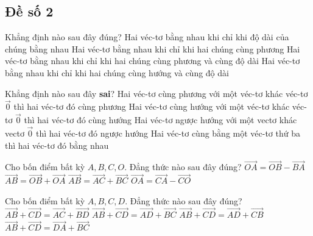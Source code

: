\subsection*{Đề số 2}
\begin{ex}%
	Khẳng định nào sau đây đúng?
	\choice
	{Hai véc-tơ bằng nhau khi chỉ khi độ dài của chúng bằng nhau}
	{Hai véc-tơ bằng nhau khi chỉ khi hai chúng cùng phương}
	{Hai véc-tơ bằng nhau khi chỉ khi hai chúng cùng phương và cùng độ dài}
	{\True Hai véc-tơ bằng nhau khi chỉ khi hai chúng cùng hướng và cùng độ dài} 
\end{ex}

\begin{ex}%
	Khẳng định nào sau đây \textbf{sai}?
	\choice
	{Hai véc-tơ cùng phương với một véc-tơ khác véc-tơ $\overrightarrow{0}$ thì hai véc-tơ đó cùng phương}
	{ Hai véc-tơ cùng hướng với một véc-tơ khác véc-tơ $\overrightarrow{0}$ thì hai véc-tơ đó cùng hướng}
	{\True Hai véc-tơ ngược hướng với một vectơ khác vectơ $\overrightarrow{0}$ thì hai véc-tơ đó ngược hướng} 
	{Hai véc-tơ cùng bằng một véc-tơ thứ ba thì hai véc-tơ đó bằng nhau} 
\end{ex}

\begin{ex}%
	Cho bốn điểm bất kỳ $A,B,C,O$. Đẳng thức nào sau đây đúng?
	\choice
	{$\overrightarrow{OA}=\overrightarrow{OB}-\overrightarrow{BA}$}
	{$\overrightarrow{AB}=\overrightarrow{OB}+\overrightarrow{OA}$}
	{$\overrightarrow{AB}=\overrightarrow{AC}+\overrightarrow{BC}$}
	{\True $\overrightarrow{OA}=\overrightarrow{CA}-\overrightarrow{CO}$}
\end{ex}

\begin{ex}%
	Cho bốn điểm bất kỳ $A,B,C,D$. Đẳng thức nào sau đây đúng?
	\choice
	{$\overrightarrow{AB} + \overrightarrow{CD}  = \overrightarrow{AC} + \overrightarrow{BD}$}
	{$\overrightarrow{AB} + \overrightarrow{CD}  = \overrightarrow{AD} + \overrightarrow{BC}$}
	{\True $\overrightarrow{AB} + \overrightarrow{CD}  = \overrightarrow{AD} + \overrightarrow{CB}$}
	{$\overrightarrow{AB} + \overrightarrow{CD}  = \overrightarrow{DA} + \overrightarrow{BC}$}
\end{ex}

